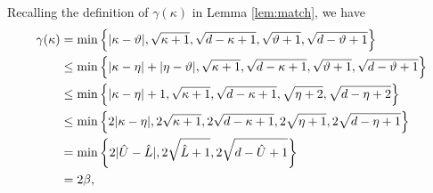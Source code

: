 \documentclass[onecolumn,letterpaper]{IEEEtran}
\newcommand{\nan}{{\kappa}}
\newcommand{\apn}{{\gamma}}
\newcommand{\mnp}{{\vartheta}}
\newcommand{\arb}{{\eta}}
\newcommand{\lwm}{{\hat{L}}}
\newcommand{\upm}{{\hat{U}}}
\newcommand{\bet}{{\beta}}
\begin{document}
\begin{IEEEproof}
Recalling the definition of $\apn(\nan)$ in Lemma \ref{lem:match}, we have 
\begin{align}
\label{ineq:gama:beta}
    \apn(\nan) &= \min\left\{ |\nan-\mnp|, \sqrt{\nan+1}, \sqrt{d-\nan+1}, \sqrt{\mnp+1}, \sqrt{d-\mnp+1} \right\} \notag\\
    &\le \min\left\{ |\nan-\arb| + |\arb-\mnp|, \sqrt{\nan+1}, \sqrt{d-\nan+1}, \sqrt{\mnp+1}, \sqrt{d-\mnp+1} \right\} \notag\\
    &\le \min\left\{ |\nan-\arb| + 1, \sqrt{\nan+1}, \sqrt{d-\nan+1}, \sqrt{\arb+2}, \sqrt{d-\arb+2} \right\} \notag\\
    &\le \min\left\{ 2|\nan-\arb|, 2\sqrt{\nan+1}, 2\sqrt{d-\nan+1}, 2\sqrt{\arb+1}, 2\sqrt{d-\arb+1} \right\} \notag\\
    &= \min\left\{ 2|\upm-\lwm|, 2\sqrt{\lwm+1}, 2\sqrt{d-\upm+1} \right\} \notag\\
    &= 2 \bet,  

\end{align}
\end{IEEEproof}
\end{document}
